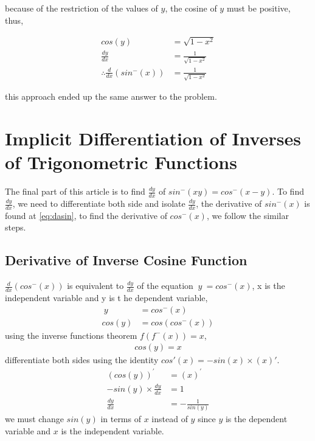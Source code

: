 \documentclass[12pt, titlepage]{article}
\begin{document}
    because of the restriction of the values of $y$, the cosine of $y$ must be positive, thus,
    \begin{center}
        \begin{align}
            cos(y)&=\sqrt{1-x^2}\\
            \frac{dy}{dx} &=\frac{1}{\sqrt{1-x^2}}\\
            \therefore \frac{d}{dx}(sin^-(x)) &=\frac{1}{\sqrt{1-x^2}}
        \end{align}
    \end{center}
    this approach ended up the same answer to the problem. 
    
\newpage
\section{Implicit Differentiation of Inverses of Trigonometric Functions}

The final part of this article is to find $\frac{dy}{dx}$ of $sin^{-}( xy) =cos^{-}( x-y)$. To find $\frac{dy}{dx}$, we need to differentiate both side and isolate $\frac{dy}{dx}$, the derivative of $sin^-(x)$ is found at \eqref{eq:dasin}, to find the derivative of $cos^-(x)$, we follow the similar steps.

    \subsection{Derivative of Inverse Cosine Function}
    $\displaystyle \frac{d}{dx}\left( cos^{-}( x)\right)$ is equivalent to $\displaystyle \frac{dy}{dx}$ of the equation $\displaystyle \ y\ =cos^{-}( x)$, x is the independent variable and y is t he dependent variable,
     \begin{align}
        \label{yisarccosin}
        \ y\ &=cos^{-}( x)\\
        cos( y) &=cos\left( cos^{-}( x)\right)
    \end{align}
    using the inverse functions theorem $\displaystyle f\left( f^{-}( x)\right) =x$,
    \begin{align}
        \label{eq:cosy}
        cos(y)=x
    \end{align}
    differentiate both sides using the identity $\displaystyle cos'( x) =-sin( x) \times ( x) '$.%
     \begin{align}
        ( cos( y))^{'} &=( x)^{'}\\
        -sin( y) \times \frac{dy}{dx} &=1\\
        \frac{dy}{dx} &=-\frac{1}{sin( y)}
    \end{align}
    we must change $sin(y)$ in terms of $x$ instead of $y$ since $y$ is the dependent variable and $x$ is the independent variable.
\end{document}
